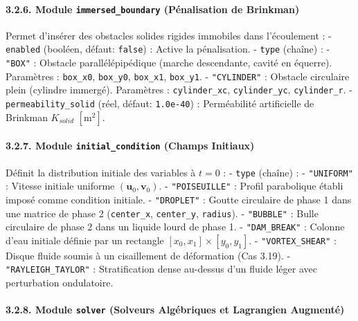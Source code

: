 \documentclass[
  french,
]{article}
\begin{document}
\paragraph{\texorpdfstring{3.2.6. Module \texttt{immersed\_boundary}
(Pénalisation de
Brinkman)}{3.2.6. Module immersed\_boundary (Pénalisation de Brinkman)}}\label{module-immersed_boundary-puxe9nalisation-de-brinkman}

Permet d'insérer des obstacles solides rigides immobiles dans
l'écoulement : - \texttt{enabled} (booléen, défaut: \texttt{false}) :
Active la pénalisation. - \texttt{type} (chaîne) : - \texttt{"BOX"} :
Obstacle parallélépipédique (marche descendante, cavité en équerre).
Paramètres : \texttt{box\_x0}, \texttt{box\_y0}, \texttt{box\_x1},
\texttt{box\_y1}. - \texttt{"CYLINDER"} : Obstacle circulaire plein
(cylindre immergé). Paramètres : \texttt{cylinder\_xc},
\texttt{cylinder\_yc}, \texttt{cylinder\_r}. -
\texttt{permeability\_solid} (réel, défaut: \texttt{1.0e-40}) :
Perméabilité artificielle de Brinkman \(K_{solid}\) \([\text{m}^2]\).

\paragraph{\texorpdfstring{3.2.7. Module \texttt{initial\_condition}
(Champs
Initiaux)}{3.2.7. Module initial\_condition (Champs Initiaux)}}\label{module-initial_condition-champs-initiaux}

Définit la distribution initiale des variables à \(t=0\) : -
\texttt{type} (chaîne) : - \texttt{"UNIFORM"} : Vitesse initiale
uniforme \((\mathbf{u}_0, \mathbf{v}_0)\). - \texttt{"POISEUILLE"} :
Profil parabolique établi imposé comme condition initiale. -
\texttt{"DROPLET"} : Goutte circulaire de phase 1 dans une matrice de
phase 2 (\texttt{center\_x}, \texttt{center\_y}, \texttt{radius}). -
\texttt{"BUBBLE"} : Bulle circulaire de phase 2 dans un liquide lourd de
phase 1. - \texttt{"DAM\_BREAK"} : Colonne d'eau initiale définie par un
rectangle \([x_0, x_1] \times [y_0, y_1]\). - \texttt{"VORTEX\_SHEAR"} :
Disque fluide soumis à un cisaillement de déformation (Cas 3.19). -
\texttt{"RAYLEIGH\_TAYLOR"} : Stratification dense au-dessus d'un fluide
léger avec perturbation ondulatoire.

\paragraph{\texorpdfstring{3.2.8. Module \texttt{solver} (Solveurs
Algébriques et Lagrangien
Augmenté)}{3.2.8. Module solver (Solveurs Algébriques et Lagrangien Augmenté)}}\label{module-solver-solveurs-alguxe9briques-et-lagrangien-augmentuxe9}
\end{document}
